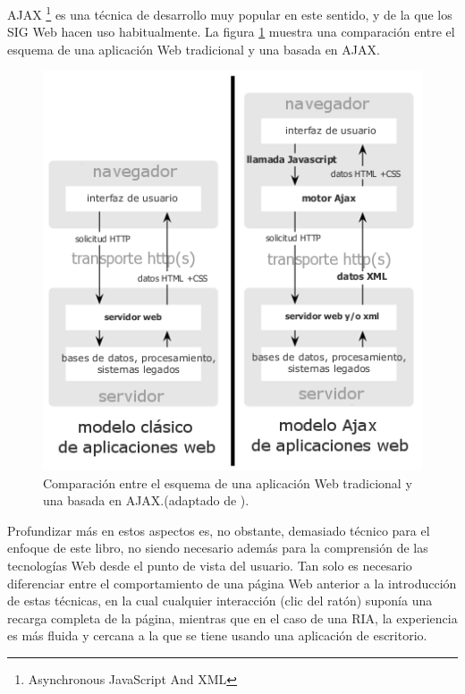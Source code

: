 AJAX \footnote{Asynchronous JavaScript And XML} \cite{garrett2005ajax} es una técnica de desarrollo muy popular en este sentido, y de la que los SIG Web hacen uso habitualmente. La figura \ref{Fig:AJAX} muestra una comparación entre el esquema de una aplicación Web tradicional y una basada en AJAX. 

\begin{figure}[!hbt]   
\centering
\includegraphics[width=.55\mycolumnwidth]{Cliente_servidor/ajax.png}
\caption{\small Comparación entre el esquema de una aplicación Web tradicional y una basada en AJAX.(adaptado de \cite{garrett2005ajax}).}
\label{Fig:AJAX} 
\end{figure}

Profundizar más en estos aspectos es, no obstante, demasiado técnico para el enfoque de este libro, no siendo necesario además para la comprensión de las tecnologías Web desde el punto de vista del usuario. Tan solo es necesario diferenciar entre el comportamiento de una página Web anterior a la introducción de estas técnicas, en la cual cualquier interacción (clic del ratón) suponía una recarga completa de la página, mientras que en el caso de una RIA, la experiencia es más fluida y cercana a la que se tiene usando una aplicación de escritorio.

